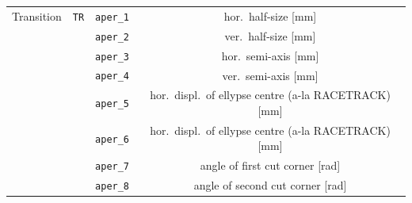 \begin{center}
\begin{longtable}{|c|c|c|c|}
    Transition & \texttt{TR} & \texttt{aper\_1} & hor.~half-size [mm] \\*
    & & \texttt{aper\_2} & ver.~half-size [mm] \\*
    & & \texttt{aper\_3} & hor.~semi-axis [mm] \\*
    & & \texttt{aper\_4} & ver.~semi-axis [mm] \\*
    & & \texttt{aper\_5} & hor.~displ.~of ellypse centre (a-la RACETRACK) [mm] \\*
    & & \texttt{aper\_6} & hor.~displ.~of ellypse centre (a-la RACETRACK) [mm] \\*
    & & \texttt{aper\_7} & angle of first cut corner [rad] \\*
    & & \texttt{aper\_8} & angle of second cut corner [rad] \\*
    \hline

\end{longtable}
\end{center}

